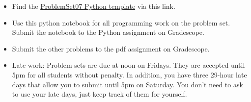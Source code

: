 \documentclass[12pt,letterpaper,noanswers]{exam}
\begin{document}
 \pdfpageheight 11in 
  \pdfpagewidth 8.5in

\begin{itemize}
    \itemsep0pt
    \item Find the \href{https://github.com/sarah1123/ScientificComputing-APMTH111/blob/main/2023Fall/PythonFiles/07_quadrature/}{ProblemSet07 Python template} via this link.
    \item Use this python notebook for all programming work on the problem set.  Submit the notebook to the Python assignment on Gradescope.
    \item Submit the other problems to the pdf assignment on Gradescope.
    \item Late work: Problem sets are due at noon on Fridays.  They are accepted until 5pm for all students without penalty.  In addition, you have three 29-hour late days that allow you to submit until 5pm on Saturday.  You don't need to ask to use your late days, just keep track of them for yourself.
\end{itemize}
\end{document}
